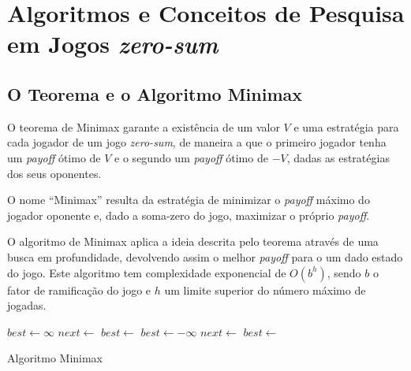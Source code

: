 \documentclass[12pt,a4paper,oneside]{article}
\begin{document}

\section{Algoritmos e Conceitos de Pesquisa em Jogos \textit{zero-sum}}
\label{sec:algconc}

\cite{Dutra:2015}
\lipsum[1]

\lipsum[2]

\subsection{O Teorema e o Algoritmo Minimax}

O teorema de Minimax garante a existência de um valor $V$ e uma estratégia para cada jogador de um jogo \emph{zero-sum}, de maneira a que o primeiro jogador tenha um \emph{payoff} ótimo de $V$ e o segundo um \emph{payoff} ótimo de $-V$, dadas as estratégias dos seus oponentes.

O nome ``Minimax'' resulta da estratégia de minimizar o \emph{payoff} máximo do jogador oponente e, dado a soma-zero do jogo, maximizar o próprio \emph{payoff}.

O algoritmo de Minimax aplica a ideia descrita pelo teorema através de uma busca em profundidade, devolvendo assim o melhor \emph{payoff} para o um dado estado do jogo. Este algoritmo tem complexidade exponencial de $O(b^{h})$, sendo $b$ o fator de ramificação do jogo e $h$ um limite superior do número máximo de jogadas.

\begin{algorithm}
\begin{algorithmic}
 
   
  \EndIf
      \State $best \gets \infty$
          \State $next \gets$ 
          \State $best \gets$ 
      \EndFor
      \State $best \gets -\infty$
          \State $next \gets$ 
          \State $best \gets$ 
      \EndFor
  \EndIf
  \State{} 
\EndFunction
\end{algorithmic}
\caption{Algoritmo Minimax}
\end{algorithm}
\end{document}
